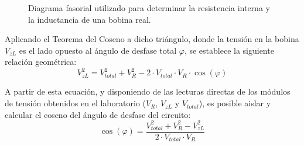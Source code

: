 \begin{figure}[H]
\centering
{}
\caption{Diagrama fasorial utilizado para determinar la resistencia interna y la inductancia de una bobina real.}
\label{fig:fasores_bobina_real}
\end{figure}

Aplicando el Teorema del Coseno a dicho triángulo, donde la tensión en la bobina $V_{zL}$ es el lado opuesto al ángulo de desfase total $\varphi$, se establece la siguiente relación geométrica:
\begin{equation}
V_{zL}^2 = V_{total}^2 + V_R^2 - 2 \cdot V_{total} \cdot V_R \cdot \cos(\varphi)
\end{equation}

A partir de esta ecuación, y disponiendo de las lecturas directas de los módulos de tensión obtenidos en el laboratorio ($V_R$, $V_{zL}$ y $V_{total}$), es posible aislar y calcular el coseno del ángulo de desfase del circuito:
\begin{equation}
\cos(\varphi) = \frac{V_{total}^2 + V_R^2 - V_{zL}^2}{2 \cdot V_{total} \cdot V_R}
\label{eq:cos_phi}
\end{equation}


